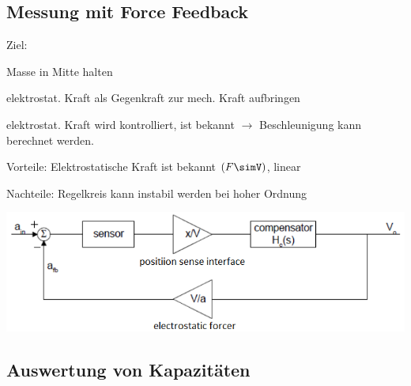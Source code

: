 \vspace{-0.5cm}
\subsection{Messung mit Force Feedback}
\begin{minipage}{0.4\textwidth}
  \begin{compactitem}
    \item Ziel: 
    \begin{compactitem}
        \item Masse in Mitte halten
        \item elektrostat. Kraft als Gegenkraft zur mech. Kraft  aufbringen
        \item elektrostat. Kraft wird kontrolliert, ist bekannt $\rightarrow$ Beschleunigung kann berechnet werden.
    \end{compactitem}
  \end{compactitem}
  \begin{compactitem}
    \item Vorteile:  Elektrostatische Kraft ist bekannt $(F\simV)$, linear
  \end{compactitem}
  \begin{compactitem}
    \item Nachteile: Regelkreis kann instabil werden bei hoher Ordnung
  \end{compactitem}
\end{minipage}
\hfill
\begin{minipage}{0.5\textwidth}
    \vspace{0pt}
    \hspace{-0.7cm}
    \includegraphics[width=1.1\textwidth]{images/Force_Feedback}
\end{minipage}

\subsection{Auswertung von Kapazitäten}

